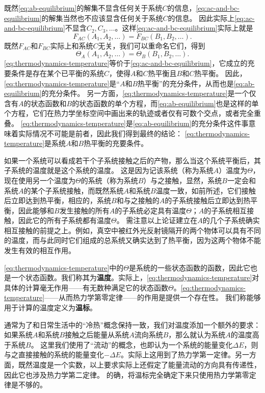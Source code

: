 \documentclass[hyperref, UTF8, a4paper]{ctexart}
\begin{document}
既然\eqref{eq:ab-equilibrium}的解集不显含任何关于系统$C$的信息，\eqref{eq:ac-and-bc-equilibrium}的解集当然也不应该显含任何关于系统$C$的信息。
因此实际上\eqref{eq:ac-and-bc-equilibrium}不显含$C_2, C_3, \ldots$。这样\eqref{eq:ac-and-bc-equilibrium}实际上就是
\[
    F_{AC} (A_1, A_2, \ldots) = F_{BC} (B_1, B_2, \ldots).
\]
既然$F_{AC}$和$F_{BC}$实际上和系统$C$无关，我们可以重命名它们，得到
\begin{equation}
    \Theta_A (A_1, A_2, \ldots) = \Theta_B (B_1, B_2, \ldots).
    \label{eq:thermodynamics-temperature}
\end{equation}
\eqref{eq:thermodynamics-temperature}等价于\eqref{eq:ac-and-bc-equilibrium}，它成立的充要条件是存在某个已平衡的系统$C$，使得$A$和$C$热平衡且$B$和$C$热平衡。
因此，\eqref{eq:thermodynamics-temperature}是“$A$和$B$热平衡”的充分条件，从而也是\eqref{eq:ab-equilibrium}的充分条件。
另一方面，\eqref{eq:thermodynamics-temperature}是一个仅含有$A$的状态函数和$B$的状态函数的单个方程，而\eqref{eq:ab-equilibrium}也是这样的单个方程，它们在热力学坐标空间中画出来的轨迹或者仅有可数个交点，或者完全重叠。
\eqref{eq:thermodynamics-temperature}是\eqref{eq:ab-equilibrium}的充分条件这件事意味着实际情况不可能是前者，因此我们得到最终的结论：
\eqref{eq:thermodynamics-temperature}是系统$A$和$B$热平衡的充要条件。

如果一个系统可以看成若干个子系统接触之后的产物，那么当这个系统平衡后，其子系统的温度就是这个系统的温度。
这是因为记该系统（称为系统$A$）温度为$\Theta$，现在使用另一个温度为$\Theta$的系统（称为系统$B$）与之接触，显然，系统$B$一定会和系统$A$的某个子系统接触，而既然系统$A$和系统$B$温度一致，如前所述，它们接触后立即达到热平衡，相应的，系统$B$和与之接触的$A$的子系统接触后立即达到热平衡，因此能够和$B$发生接触的所有$A$的子系统必定具有温度$\Theta$；$A$的子系统相互接触，因此它的所有子系统都有温度$\Theta$。
需注意以上论证建立在$A$的几个子系统确实相互接触的前提之上。例如，真空中被红外光反射镜隔开的两个物体可以具有不同的温度，而与此同时它们组成的总系统又确实达到了热平衡，因为这两个物体不能发生有效的相互作用。

\eqref{eq:thermodynamics-temperature}中的$\Theta$是系统的一些状态函数的函数，因此它也是一个状态函数。我们称其为\textbf{温度}。实际上，\eqref{eq:thermodynamics-temperature}对具体的计算毫无作用——有无数种满足它的状态函数$\Theta$。\eqref{eq:thermodynamics-temperature}——从而热力学第零定律——的作用是提供一个存在性。
我们称能够用于计算的温度定义为\textbf{温标}。

通常为了和日常生活中的“冷热”概念保持一致，我们对温度添加一个额外的要求：如果系统$A$和系统$B$接触之后能量从系统$A$流向系统$B$，那么就认为系统$A$的温度高于系统$B$。
这里我们使用了“流动”的概念，也即认为一个系统的能量变化$\Delta E$，则与之直接接触的系统的能量变化$-\Delta E$。实际上这用到了热力学第一定律。另一方面，既然温度是一个实数，以上要求实际上还假定了能量流动的方向具有传递性，因此它也涉及热力学第二定律。
的确，将温标完全确定下来只使用热力学第零定律是不够的。
\end{document}
